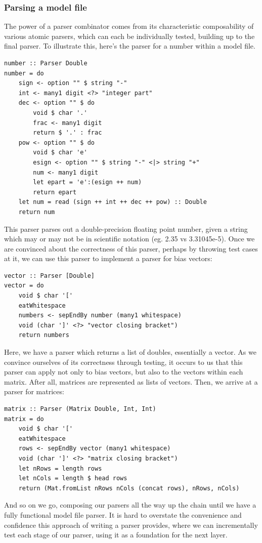 \documentclass[12pt, titlepage]{article}
\begin{document}
\subsubsection{Parsing a model file}
The power of a parser combinator comes from its characteristic composability of various atomic parsers, which can each be individually tested, building up to the final parser. To illustrate this, here's the parser for a number within a model file.
\begin{lstlisting}
number :: Parser Double
number = do
	sign <- option "" $ string "-"
	int <- many1 digit <?> "integer part"
	dec <- option "" $ do
		void $ char '.'
		frac <- many1 digit
		return $ '.' : frac
	pow <- option "" $ do
		void $ char 'e'
		esign <- option "" $ string "-" <|> string "+"
		num <- many1 digit
		let epart = 'e':(esign ++ num)
		return epart
	let num = read (sign ++ int ++ dec ++ pow) :: Double
	return num	
\end{lstlisting}
This parser parses out a double-precision floating point number, given a string which may or may not be in scientific notation (eg. 2.35 vs 3.31045e-5). Once we are convinced about the correctness of this parser, perhaps by throwing test cases at it, we can use this parser to implement a parser for bias vectors:
\begin{lstlisting}
vector :: Parser [Double]
vector = do
	void $ char '['
	eatWhitespace
	numbers <- sepEndBy number (many1 whitespace)
	void (char ']' <?> "vector closing bracket")
	return numbers
\end{lstlisting}
Here, we have a parser which returns a list of doubles, essentially a vector. As we convince ourselves of its correctness through testing, it occurs to us that this parser can apply not only to bias vectors, but also to the vectors within each matrix. After all, matrices are represented as lists of vectors. Then, we arrive at a parser for matrices:
\begin{lstlisting}
matrix :: Parser (Matrix Double, Int, Int)
matrix = do
	void $ char '['
	eatWhitespace
	rows <- sepEndBy vector (many1 whitespace)
	void (char ']' <?> "matrix closing bracket")
	let nRows = length rows
	let nCols = length $ head rows
	return (Mat.fromList nRows nCols (concat rows), nRows, nCols)
\end{lstlisting}
And so on we go, composing our parsers all the way up the chain until we have a fully functional model file parser. It is hard to overstate the convenience and confidence this approach of writing a parser provides, where we can incrementally test each stage of our parser, using it as a foundation for the next layer.
\end{document}
